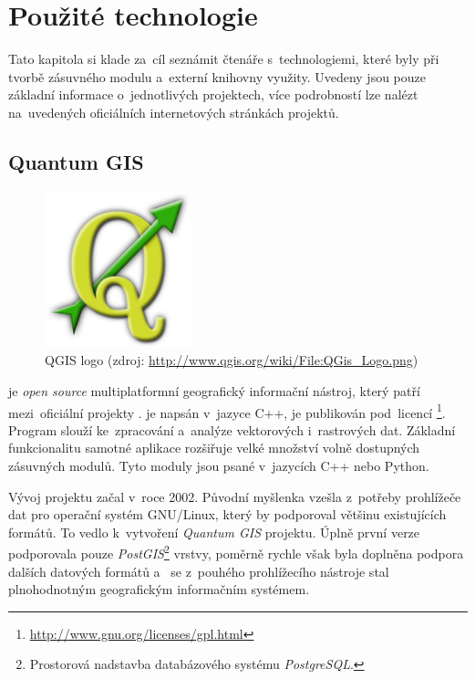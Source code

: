 \chapter{Použité technologie}
\label{4-technologie}

Tato kapitola si klade za~cíl seznámit čtenáře s~technologiemi, které byly 
při tvorbě zásuv\-ného modulu a~externí knihovny využity. Uvedeny jsou pouze
základní informace o~jednotlivých projektech, více podrobností lze
nalézt na~uvedených oficiálních internetových stránkách projektů.


\section{Quantum GIS}
\label{qgis}

  \begin{figure}[H]
    \centering
      \includegraphics[width=120pt]{./pictures/qgis.png}
      \caption[QGIS logo]{QGIS logo 
      (zdroj: \url{http://www.qgis.org/wiki/File:QGis_Logo.png})}
      \label{fig:qgis}
  \end{figure}

 je \textit{open source} multiplatformní geografický 
informační ná\-stroj, který patří mezi~oficiální projekty .
 je napsán v~jazyce C++, je pu\-blikován pod~licencí 
\footnote{\url{http://www.gnu.org/licenses/gpl.html}}. 
Program slouží ke~zpracování a~analýze vektorových i~rastrových dat. 
Základní funkcionalitu sa\-motné aplikace rozšiřuje velké množství 
volně dostupných zásuvných modulů. Tyto moduly jsou psané v~jazycích 
C++ nebo Python.

Vývoj projektu  začal v~roce 2002. Původní myšlenka vzešla 
z~potřeby prohlížeče  dat pro operační systém GNU/Linux, který 
by podporoval většinu existujících formátů. To vedlo k~vytvoření 
\textit{Quantum GIS} projektu. Úplně první verze podporovala pouze 
\textit{PostGIS}\footnote{Prostorová nadstavba databázového systému 
\textit{PostgreSQL}.} vrstvy, poměrně rychle však byla doplněna podpora 
dalších datových formátů a~ se z~pouhého prohlížecího nástroje 
stal plnohodnotným geografickým informačním systémem.


